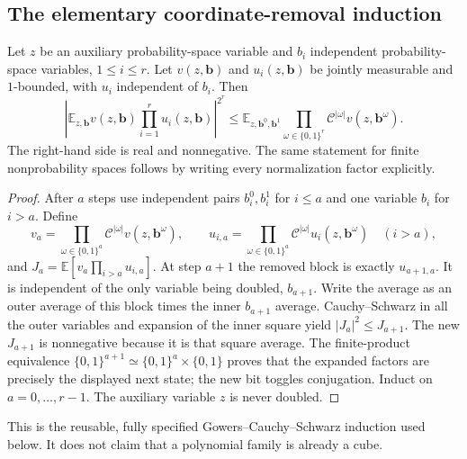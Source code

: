 \documentclass[11pt]{article}
\theoremstyle{definition}
\begin{document}
\subsection{The elementary coordinate-removal induction}
\begin{lemma}\label{patch:cylinder}
Let $z$ be an auxiliary probability-space variable and $b_i$ independent probability-space
variables, $1\leq i\leq r$.  Let $v(z,\mathbf b)$ and $u_i(z,\mathbf b)$ be jointly measurable and $1$-bounded,
with $u_i$ independent of $b_i$.  Then
\[
 \left|\mathbb E_{z,\mathbf b}v(z,\mathbf b)\prod_{i=1}^r u_i(z,\mathbf b)\right|^{2^r}
 \leq\mathbb E_{z,\mathbf b^0,\mathbf b^1}
       \prod_{\omega\in\{0,1\}^r}\mathcal C^{|\omega|}v(z,\mathbf b^\omega).
\]
The right-hand side is real and nonnegative.  The same statement for finite nonprobability
spaces follows by writing every normalization factor explicitly.
\end{lemma}
\begin{proof}
After $a$ steps use independent pairs $b_i^0,b_i^1$ for $i\leq a$ and one variable $b_i$
for $i>a$.  Define
\[
 v_a=\prod_{\omega\in\{0,1\}^a}\mathcal C^{|\omega|}v(z,\mathbf b^\omega),
 \qquad
 u_{i,a}=\prod_{\omega\in\{0,1\}^a}\mathcal C^{|\omega|}u_i(z,\mathbf b^\omega)
 \quad(i>a),
\]
and $J_a=\mathbb E[v_a\prod_{i>a}u_{i,a}]$.
At step $a+1$ the removed block is exactly $u_{a+1,a}$.
It is independent of the only variable being doubled, $b_{a+1}$.
Write the average as an outer average of this block times the inner $b_{a+1}$ average.
Cauchy--Schwarz in all the outer variables and expansion of the inner square yield
$|J_a|^2\leq J_{a+1}$.  The new $J_{a+1}$ is nonnegative because it is that square average.
The finite-product equivalence $\{0,1\}^{a+1}\simeq\{0,1\}^a\times\{0,1\}$ proves
that the expanded factors are precisely the displayed next state; the new bit toggles
conjugation.  Induct on $a=0,\ldots,r-1$.  The auxiliary variable $z$ is never doubled.
\end{proof}
This is the reusable, fully specified Gowers--Cauchy--Schwarz induction used below.
It does not claim that a polynomial family is already a cube.
\end{document}
